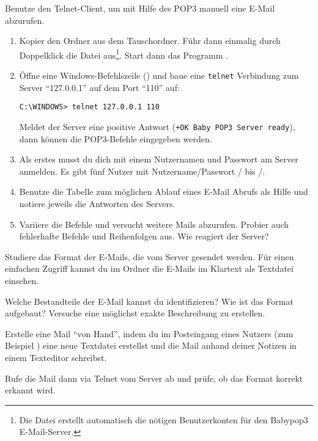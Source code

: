 \documentclass[10pt, a4paper]{arbeitsblatt}
\begin{document}
\begin{aufgabe}[icon=\iconComputer\,\iconBlatt]
Benutze den Telnet-Client, um mit Hilfe des POP3 manuell eine E-Mail abzurufen.

\begin{enumerate}
	\item Kopier den Ordner  aus dem Tauschordner. Führ dann einmalig durch Doppelklick die Datei  aus\footnote{Die Datei erstellt automatisch die nötigen Benutzerkonten für den Babypop3 E-Mail-Server.}. Start dann das Programm .
	\item Öffne eine Windows-Befehlszeile () und baue eine \texttt{telnet} Verbindung zum Server \enquote{127.0.0.1} auf dem Port \enquote{110} auf:

	\begin{center}
		\verb|C:\WINDOWS> telnet 127.0.0.1 110|
	\end{center}

	Meldet der Server eine positive Antwort (\verb|+OK Baby POP3 Server ready|), dann können die POP3-Befehle eingegeben werden.
	\item Als erstes musst du dich mit einem Nutzernamen und Passwort am Server anmelden. Es gibt fünf Nutzer mit Nutzername/Passwort / bis /.
	\item Benutze die Tabelle zum möglichen Ablauf eines E-Mail Abrufs als Hilfe und notiere jeweils die Antworten des Servers.
	\item Variiere die Befehle und versucht weitere Mails abzurufen. Probier auch fehlerhafte Befehle und Reihenfolgen aus. Wie reagiert der Server?
\end{enumerate}
\end{aufgabe}

\begin{aufgabe}[icon=\iconComputer\,\iconHeft]
	Studiere das Format der E-Mails, die vom Server gesendet werden. Für einen einfachen Zugriff kannst du im Ordner  die E-Mails im Klartext als Textdatei einsehen.

	\medskip
	Welche Bestandteile der E-Mail kannst du identifizieren? Wie ist das Format aufgebaut? Versuche eine möglichst exakte Beschreibung zu erstellen.
\end{aufgabe}

\begin{aufgabe*}[icon=\iconComputer]
Erstelle eine Mail \enquote{von Hand}, indem du im Posteingang eines Nutzers (zum Beispiel ) eine neue Textdatei erstellst und die Mail anhand deiner Notizen in einem Texteditor schreibst.

Rufe die Mail dann via Telnet vom Server ab und prüfe, ob das Format korrekt erkannt wird.
\end{aufgabe*}
\end{document}
